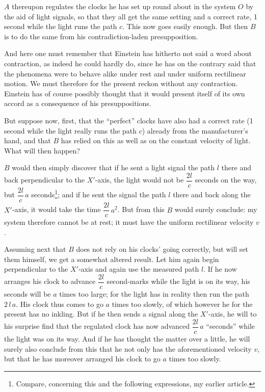 \documentclass[12pt,a4paper]{article}
\begin{document}
$A$ thereupon regulates the clocks he has set up round about in the system $O$
by the aid of light signals, so that they all get the same setting and a
correct rate, 1 second while the light runs the path $c$. This now goes easily
enough. But then $B$ is to do the same from his contradiction-laden
presupposition.

And here one must remember that Einstein has hitherto not said a word about
contraction, as indeed he could hardly do, since he has on the contrary said
that the phenomena were to behave alike under rest and under uniform
rectilinear motion. We must therefore for the present reckon without any
contraction. Einstein has of course possibly thought that it would present
itself of its own accord as a consequence of his presuppositions.

But suppose now, first, that the ``perfect'' clocks have also had a correct
rate (1 second while the light really runs the path $c$) already from the
manufacturer's hand, and that $B$ has relied on this as well as on the
constant velocity of light. What will then happen?

$B$ would then simply discover that if he sent a light signal the path $l$
there and back perpendicular to the $X'$-axis, the light would not be
$\dfrac{2l}{c}$ seconds on the way, but $\dfrac{2l}{c}\,a$
seconds\footnote{Compare, concerning this and the following expressions, my
earlier article.}; and if he sent the signal the path $l$ there and back along
the $X'$-axis, it would take the time $\dfrac{2l}{c}\,a^{2}$. But from this
$B$ would surely conclude: my system therefore cannot be at rest; it must have
the uniform rectilinear velocity $v$.

Assuming next that $B$ does not rely on his clocks' going correctly, but will
set them himself, we get a somewhat altered result. Let him again begin
perpendicular to the $X'$-axis and again use the measured path $l$. If he now
arranges his clock to advance $\dfrac{2l}{c}$ second-marks while the light is
on its way, his seconds will be $a$ times too large; for the light has in
reality then run the path $2\,l\,a$. His clock thus comes to go $a$ times too
slowly, of which however he for the present has no inkling. But if he then
sends a signal along the $X'$-axis, he will to his surprise find that the
regulated clock has now advanced $\dfrac{2l}{c}\,a$ ``seconds'' while the
light was on its way. And if he has thought the matter over a little, he will
surely also conclude from this that he not only has the aforementioned
velocity $v$, but that he has moreover arranged his clock to go $a$ times too
slowly.
\end{document}
